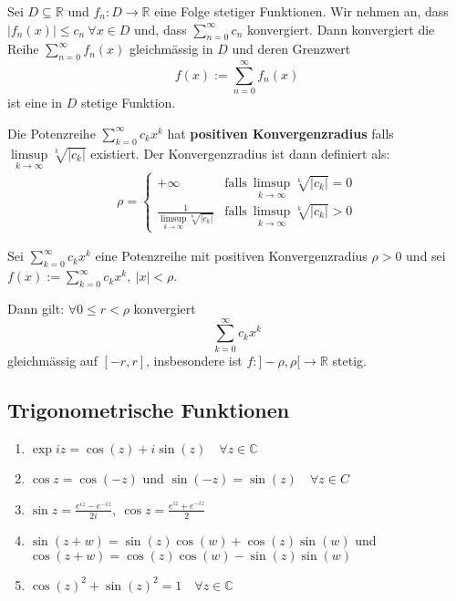 \documentclass[8pt,a4paper,twocolumn,table]{extarticle}
\newcommand{\R}{\mathbb{R}}
\newcommand{\C}{\mathbb{C}}
\begin{document}
\begin{satz}{3.38}
    Sei $D \subseteq \R$ und $f_n : D \to \R$ eine Folge stetiger Funktionen. Wir nehmen an, dass $|f_n(x)| \le c_n\ \forall x \in D$
    und, dass $\sum_{n=0}^\infty c_n$ konvergiert. Dann konvergiert die Reihe $\sum_{n=0}^\infty f_n(x)$ gleichmässig in $D$ und deren Grenzwert
    \[ f(x) := \sum_{n=0}^\infty f_n(x) \]
    ist eine in $D$ stetige Funktion.
\end{satz}

\begin{definition}{3.39}
    Die Potenzreihe $\sum_{k=0}^\infty c_k x^k$ hat \textbf{positiven Konvergenzradius} falls $\underset{k \to \infty}{\limsup} \sqrt[k]{|c_k|}$ existiert.
    Der Konvergenzradius ist dann definiert als:
    \begin{align*}
        \rho = \begin{cases}
            +\infty                                                    & \mbox{falls}\ \underset{k \to \infty}{\limsup} \sqrt[k]{|c_k|} = 0 \\
            \frac{1}{\underset{k \to \infty}{\limsup} \sqrt[k]{|c_k|}} & \mbox{falls}\ \underset{k \to \infty}{\limsup} \sqrt[k]{|c_k|} > 0
        \end{cases}
    \end{align*}
\end{definition}

\begin{satz}{3.40}
    Sei $\sum_{k=0}^\infty c_k x^k$ eine Potenzreihe mit positiven Konvergenzradius $\rho > 0$ und sei
    $f(x) := \sum_{k = 0}^\infty c_k x^k,\ |x| < \rho$.

    Dann gilt: $\forall 0 \le r < \rho$ konvergiert
    \[ \sum_{k=0}^\infty c_k x^k \]
    gleichmässig auf $[-r, r]$, insbesondere ist $f: ]-\rho, \rho[ \to \R$ stetig.
\end{satz}

\subsection{Trigonometrische Funktionen}

\begin{satz}{3.42}
    \begin{enumerate}
        \item $\exp iz = \cos(z) + i \sin(z)\quad \forall z \in \C$
        \item $\cos z = \cos(-z)$ und $\sin(-z) = \sin(z)\quad \forall z \in C$
        \item $\sin z = \frac{e^{iz} - e^{-iz}}{2i},\ \cos z = \frac{e^{iz} + e^{-iz}}{2}$
        \item $\sin(z + w) = \sin(z)\cos(w) + \cos(z)\sin(w)$ und $\cos(z + w) = \cos(z)\cos(w) - \sin(z)\sin(w)$
        \item $\cos(z)^2 + \sin(z)^2 = 1\quad \forall z \in \C$
    \end{enumerate}
\end{satz}
\end{document}
